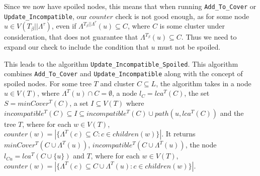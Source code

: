 \documentclass{article}
\newcommand{\leafset}{\Lambda}
\newcommand{\TB}{T_\beta}
\begin{document}
    Since we now have spoiled nodes, this means that when running \texttt{Add\_To\_Cover} or \texttt{Update\_Incompatible}, our $counter$ check is not good enough, as for some node $u \in V(\TB||\leafset^{\tau})$, even if $\leafset^{\TB||\leafset^{\tau}}(u) \subseteq C$, where $C$ is some cluster under consideration, that does not guarantee that $\leafset^{\TB}(u) \subseteq C$. Thus we need to expand our check to include the condition that $u$ must not be spoiled.

    This leads to the algorithm \texttt{Update\_Incompatible\_Spoiled}. This algorithm combines \texttt{Add\_To\_Cover} and \texttt{Update\_Incompatible} along with the concept of spoiled nodes. For some tree $T$ and cluster $C \subseteq L$, the algorithm takes in a node $u \in V(T)$, where $\leafset^{T}(u) \cap C = \emptyset$, a node $l_C = lca^{T}(C)$, the set $S = minCover^{T}(C)$, a set $I \subseteq V(T)$ where $incompatible^{T}(C) \subseteq I \subseteq incompatible^{T}(C) \cup path(u, lca^T(C))$ and the tree $T$, where for each $w \in V(T)$, $counter(w) = |\{\leafset^{T}(c) \subseteq C : c \in children(w)\}|$. It returns $minCover^{T}(C \cup \leafset^{T}(u))$, $incompatible^{T}(C \cup \leafset^{T}(u))$, the node $l_{Cu} = lca^{T}(C \cup \{u\})$ and $T$, where for each $w \in V(T)$, $counter(w) = |\{\leafset^{T}(c) \subseteq C \cup \leafset^{T}(u) : c \in children(w)\}|$.
\end{document}
